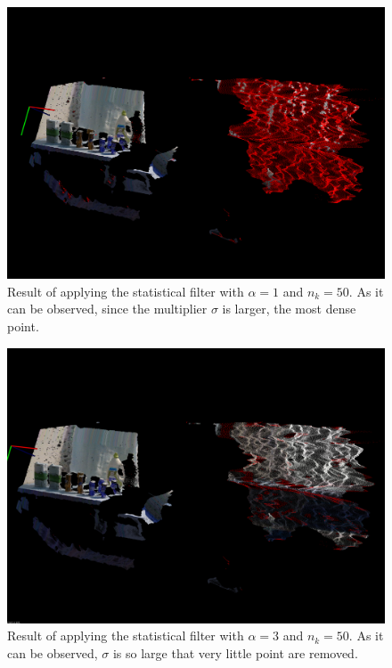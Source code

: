 \documentclass[../main.tex]{subfiles}
\begin{document}
\begin{figure}[htbp]
    \centering
    \includegraphics[width=1\textwidth]{images/stat_filter1std.png}
    \caption{Result of applying the statistical filter with $\alpha=1$ and $n_{k}=50$. As it can be observed, since the multiplier $\sigma$ is larger, the most dense point.}
    \label{fig:stat_filter1std}
\end{figure}

\begin{figure}[htbp]
    \centering
    \includegraphics[width=1\textwidth]{images/stat_filter3std.png}
    \caption{Result of applying the statistical filter with $\alpha=3$ and $n_{k}=50$. As it can be observed, $\sigma$ is so large that very little point are removed.}
    \label{fig:stat_filter3std}
\end{figure}
\end{document}
